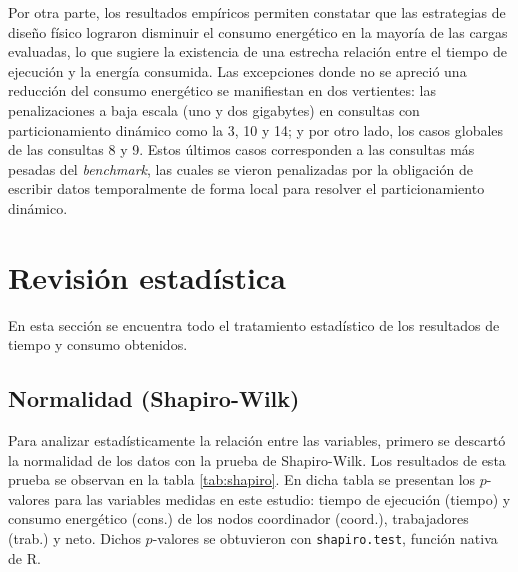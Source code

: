 \documentclass[12pt, letter paper]{report}
\begin{document}
      Por otra parte, los resultados empíricos permiten constatar que las
      estrategias de diseño físico lograron disminuir el consumo energético en
      la mayoría de las cargas evaluadas, lo que sugiere la existencia de una
      estrecha relación entre el tiempo de ejecución y la energía consumida. Las
      excepciones donde no se apreció una reducción del consumo energético se
      manifiestan en dos vertientes: las penalizaciones a baja escala (uno y dos
      gigabytes) en consultas con particionamiento dinámico como la 3, 10 y 14;
      y por otro lado, los casos globales de las consultas 8 y 9. Estos últimos
      casos corresponden a las consultas más pesadas del \textit{benchmark}, las
      cuales se vieron penalizadas por la obligación de escribir datos
      temporalmente de forma local para resolver el particionamiento dinámico.

    \section{Revisión estadística} %
    \label{sec:revision_estadistica}
      En esta sección se encuentra todo el tratamiento estadístico de los
      resultados de tiempo y consumo obtenidos.

      \subsection{Normalidad (Shapiro-Wilk)} %
      \label{sub:normalidad_shapiro_wilk}
        Para analizar estadísticamente la relación entre las variables, primero
        se descartó la normalidad de los datos con la prueba de Shapiro-Wilk.
        Los resultados de esta prueba se observan en la tabla \ref{tab:shapiro}.
        En dicha tabla se presentan los $p$-valores para las variables medidas
        en este estudio: tiempo de ejecución (tiempo) y consumo energético
        (cons.) de los nodos coordinador (coord.), trabajadores (trab.) y neto.
        Dichos $p$-valores se obtuvieron con \texttt{shapiro.test}, función
        nativa de R.
\end{document}
